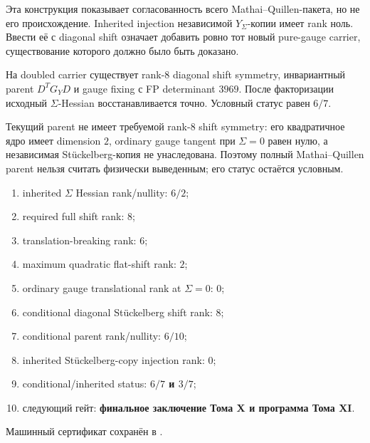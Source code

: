 Эта конструкция показывает согласованность всего Mathai--Quillen-пакета,
но не его происхождение. Inherited injection независимой
$Y_\Sigma$-копии имеет rank ноль. Ввести её с diagonal shift означает
добавить ровно тот новый pure-gauge carrier, существование которого должно
было быть доказано.

\begin{theorem}
На doubled carrier существует rank-$8$ diagonal shift symmetry,
инвариантный parent $D^TG_YD$ и gauge fixing с FP determinant $3969$.
После факторизации исходный $\Sigma$-Hessian восстанавливается точно.
Условный статус равен $6/7$.
\end{theorem}

\begin{nogocriterion}
Текущий parent не имеет требуемой rank-$8$ shift symmetry: его квадратичное
ядро имеет dimension $2$, ordinary gauge tangent при $\Sigma=0$ равен
нулю, а независимая Stückelberg-копия не унаследована. Поэтому полный
Mathai--Quillen parent нельзя считать физически выведенным; его статус
остаётся условным.
\end{nogocriterion}

\begin{protocol}\begin{enumerate}
\item inherited $\Sigma$ Hessian rank/nullity: \textbf{$6/2$};
\item required full shift rank: \textbf{$8$};
\item translation-breaking rank: \textbf{$6$};
\item maximum quadratic flat-shift rank: \textbf{$2$};
\item ordinary gauge translational rank at $\Sigma=0$: \textbf{$0$};
\item conditional diagonal Stückelberg shift rank: \textbf{$8$};
\item conditional parent rank/nullity: \textbf{$6/10$};
\item inherited Stückelberg-copy injection rank: \textbf{$0$};
\item conditional/inherited status: \textbf{$6/7$ и $3/7$};
\item следующий гейт: \textbf{финальное заключение Тома X и программа Тома XI}.
\end{enumerate}\end{protocol}

Машинный сертификат сохранён в
.